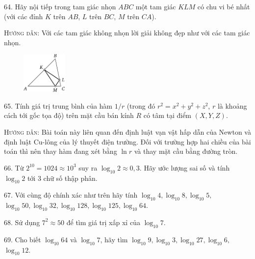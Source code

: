 \begin{problem}{64.}
	Hãy nội tiếp trong tam giác nhọn $ABC$ một tam giác $KLM$ có chu vi bé nhất (với các đỉnh $K$ trên $AB$, $L$ trên $BC$, $M$ trên $CA$).

	\textsc{Hướng dẫn}: Với các tam giác không nhọn  lời giải không đẹp như với các tam giác nhọn. 
	\begin{figure}
		\centering\includegraphics[width=0.2\textwidth]{taskbook-48}
	\end{figure}
\end{problem}

\begin{problem}{65.}
	Tính giá trị trung bình của hàm $1/r$ (trong đó $r^2=x^2+y^2+z^2$, $r$ là khoảng cách tới gốc tọa độ) trên mặt cầu bán kính $R$ có tâm tại điểm $(X,Y,Z)$.

	\textsc{Hướng dẫn}: Bài toán này liên quan đến định luật vạn vật hấp dẫn của Newton và định luật Cu-lông của lý thuyết điện trường. Đối với trường hợp hai chiều của bài toán thì nên thay hàm đang xét bằng $\ln r$ và thay mặt cầu bằng đường tròn.
\end{problem}

\begin{problem}{66.}
	Từ $2^{10}=1024\approx 10^3$ suy ra $\log_{10}2\approx 0,3$. Hãy ước lượng sai số và tính $\log_{10}2$ tới 3 chữ số thập phân.
\end{problem}

\begin{problem}{67.}
	Với cùng độ chính xác như  trên hãy tính $\log_{10}4, \log_{10}8, \log_{10}5,$ $ \log_{10}50, \log_{10}32, \log_{10}128, \log_{10}125, \log_{10}64.$
\end{problem}

\begin{problem}{68.}
	Sử dụng $7^2\approx 50$ để tìm giá trị xấp xỉ của $\log_{10}7$. 
\end{problem}

\begin{problem}{69.}
	Cho biết $\log_{10}64$ và $\log_{10}7$, hãy tìm $\log_{10}9, \log_{10}3, \log_{10}27, \log_{10}6,$ $ \log_{10}12$.
\end{problem}

